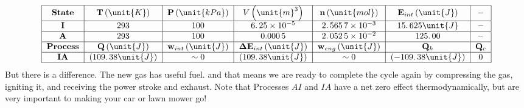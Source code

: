 \documentclass{article}
\begin{document}
\[
\begin{tabular}{|c|c|c|c|c|c|c|}
\hline
\textbf{State} & $\mathbf{T}\left( \unit{K}\right) $ & $\mathbf{P}\left( 
\unit{kPa}\right) $ & $%
\ooalign{\hfil$V$\hfil\cr\kern0.1em--\hfil\cr}%
\left( \unit{m}^{3}\right) $ & $\mathbf{n}\left( \unit{mol}\right) $ & $%
\mathbf{E}_{int}\left( \unit{J}\right) $ & \textbf{--} \\ \hline
$\mathbf{I}$ & $293$ & $100$ & $6.\,25\times 10^{-5}$ & $2.\,\allowbreak
565\,7\times 10^{-3}$ & $15.\,\allowbreak 625\unit{J}$ & \textbf{--} \\ 
\hline
$\mathbf{A}$ & $293$ & $100$ & $0.000\,5$ & $2.\,052\,5\times 10^{-2}$ & $%
\allowbreak 125.\,\allowbreak 00$ & \textbf{--} \\ \hline
\textbf{Process} & $\mathbf{Q}\left( \unit{J}\right) $ & $\mathbf{w}%
_{int}\left( \unit{J}\right) $ & $\mathbf{\Delta E}_{int}\left( \unit{J}%
\right) $ & $\mathbf{w}_{eng}\left( \unit{J}\right) $ & $\mathbf{Q}_{h}$ & $%
\mathbf{Q}_{c}$ \\ \hline
$\mathbf{IA}$ & $\left( 109.\,\allowbreak 38\unit{J}\right) $ & $\sim 0$ & $%
\left( 109.\,\allowbreak 38\unit{J}\right) $ & $\sim 0$ & $\left(
-109.\,\allowbreak 38\unit{J}\right) $ & $0$ \\ \hline
\end{tabular}%
\]%
But there is a difference. The new gas has useful fuel. and that means we
are ready to complete the cycle again by compressing the gas, igniting it,
and receiving the power stroke and exhaust. Note that Processes $AI$ and $IA$
have a net zero effect thermodynamically, but are very important to making
your car or lawn mower go!
\end{document}
